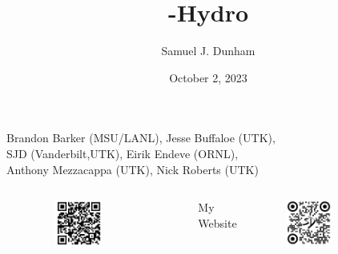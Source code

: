 \documentclass{beamer}
\title[NR Community Call]{\thornado-Hydro}
\author{Samuel J. Dunham}
\date{October 2, 2023}
\begin{document}
\begin{frame}

  \titlepage

    \begin{center}
      Brandon Barker (MSU/LANL), %
      Jesse Buffaloe (UTK), \\
      SJD (Vanderbilt,UTK), %
      Eirik Endeve (ORNL), \\
      Anthony Mezzacappa (UTK), %
      Nick Roberts (UTK)
    \end{center}

  \vspace{-1em}

  \begin{columns}[c]

      \begin{center}\thornado\end{center}
      \vspace{-1.5em}
      \begin{figure}[htb!]
        \centering
        \includegraphics[width=0.5\textwidth]{fig.thornado.png}
      \end{figure}

      \begin{center}My Website\end{center}
      \vspace{-1.5em}
      \begin{figure}[htb!]
        \centering
        \includegraphics[width=0.5\textwidth]{fig.website.png}
      \end{figure}

  \end{columns}

\end{frame}
\end{document}
